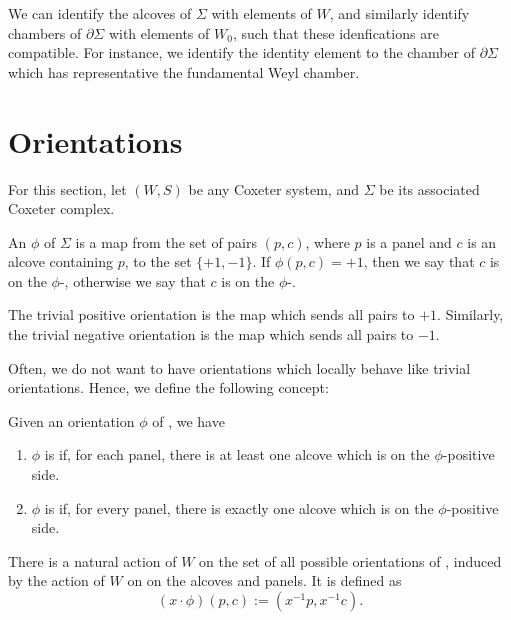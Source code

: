 \documentclass[11pt]{article}
\begin{document}
We can identify the alcoves of $\Sigma$ with elements of $W$, and similarly identify chambers of $\partial\Sigma$ with elements of $W_0$, such that these idenfications are compatible. For instance, we identify the identity element to the chamber of $\partial\Sigma$ which has representative the fundamental Weyl chamber. 


\section{Orientations}

For this section, let $(W,S)$ be any Coxeter system, and $\Sigma$ be its associated Coxeter complex.

\begin{definition}
    An  $\phi$ of $\Sigma$ is a map from the set of pairs $(p,c)$, where $p$ is a panel and $c$ is an alcove containing $p$, to the set $\{+1,-1\}$. If $\phi (p,c)=+1$, then we say that $c$ is on the $\phi$-, otherwise we say that $c$ is on the $\phi$-. 
\end{definition}


\begin{example}
    The trivial positive orientation is the map which sends all pairs to $+1$. Similarly, the trivial negative orientation is the map which sends all pairs to $-1$. 
\end{example}

Often, we do not want to have orientations which locally behave like trivial orientations. Hence, we define the following concept:

\begin{definition}
    Given an orientation $\phi$ of \sg, we have
    \begin{enumerate}
        \item $\phi$ is  if, for each panel, there is at least one alcove which is on the $\phi$-positive side.
        \item $\phi$ is  if, for every panel, there is exactly one alcove which is on the $\phi$-positive side.
    \end{enumerate}
\end{definition}


There is a natural action of $W$ on the set of all possible orientations of \sg, induced by the action of $W$ on on the alcoves and panels. It is defined as 
\[(x\cdot\phi)(p,c):=(x^{-1}p,x^{-1}c).\]
\end{document}
